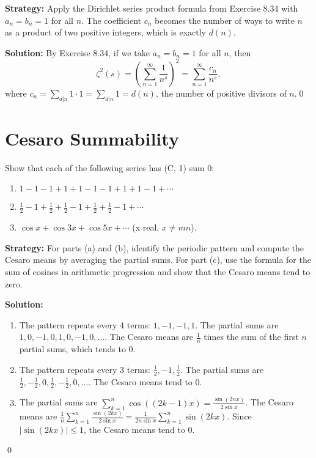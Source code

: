 \noindent\textbf{Strategy:} Apply the Dirichlet series product formula from Exercise 8.34 with \(a_n = b_n = 1\) for all \(n\). The coefficient \(c_n\) becomes the number of ways to write \(n\) as a product of two positive integers, which is exactly \(d(n)\).

\bigskip\noindent\textbf{Solution:}
By Exercise 8.34, if we take \(a_n = b_n = 1\) for all \(n\), then
\[\zeta^2(s) = \left(\sum_{n=1}^{\infty} \frac{1}{n^s}\right)^2 = \sum_{n=1}^{\infty} \frac{c_n}{n^s},\]
where \(c_n = \sum_{d|n} 1 \cdot 1 = \sum_{d|n} 1 = d(n)\), the number of positive divisors of \(n\).\qed

\section{Cesaro Summability}



\begin{problembox}
\begin{problemstatement}
Show that each of the following series has (C, 1) sum 0:
\begin{enumerate}[label=\alph*)]
\item \(1 - 1 - 1 + 1 + 1 - 1 - 1 + 1 + 1 - 1 + \cdots\)
\item \(\frac{1}{2} - 1 + \frac{1}{2} + \frac{1}{2} - 1 + \frac{1}{2} + \frac{1}{2} - 1 + \cdots\)
\item \(\cos x + \cos 3x + \cos 5x + \cdots\) (x real, \(x \neq mn\)).
\end{enumerate}
\end{problemstatement}
\end{problembox}

\noindent\textbf{Strategy:} For parts (a) and (b), identify the periodic pattern and compute the Cesaro means by averaging the partial sums. For part (c), use the formula for the sum of cosines in arithmetic progression and show that the Cesaro means tend to zero.

\bigskip\noindent\textbf{Solution:}
\begin{enumerate}[label=(\alph*)]
\item The pattern repeats every 4 terms: \(1, -1, -1, 1\). The partial sums are \(1, 0, -1, 0, 1, 0, -1, 0, \ldots\). The Cesaro means are \(\frac{1}{n}\) times the sum of the first \(n\) partial sums, which tends to 0.

\item The pattern repeats every 3 terms: \(\frac{1}{2}, -1, \frac{1}{2}\). The partial sums are \(\frac{1}{2}, -\frac{1}{2}, 0, \frac{1}{2}, -\frac{1}{2}, 0, \ldots\). The Cesaro means tend to 0.

\item The partial sums are \(\sum_{k=1}^n \cos((2k-1)x) = \frac{\sin(2nx)}{2\sin x}\). The Cesaro means are \(\frac{1}{n} \sum_{k=1}^n \frac{\sin(2kx)}{2\sin x} = \frac{1}{2n\sin x} \sum_{k=1}^n \sin(2kx)\). Since \(|\sin(2kx)| \leq 1\), the Cesaro means tend to 0.
\end{enumerate}\qed



